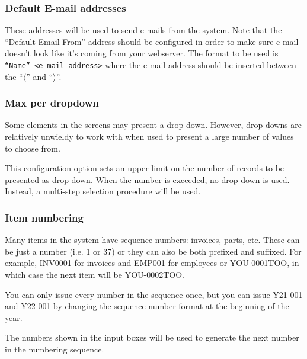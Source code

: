 \subsubsection{Default E-mail addresses}
\label{subsubsec-company-config-defaults-email}

These addresses will be used to send e-mails from the system.
Note that the ``Default Email From'' address should be configured in order to make sure
e-mail doesn't look like it's coming from your webserver. The format to be used is \texttt{``Name'' <e-mail address>} where the e-mail address should be inserted between the
``$\langle$'' and ``$\rangle$''.

\subsubsection{Max per dropdown}
\label{subsubsec-company-config-defaults-max-dropdown}

Some elements in the screens may present a drop down. However, drop downs are
relatively unwieldy to work with when used to present a large number of values
to choose from.

This configuration option sets an upper limit on the number of records to be
presented as drop down.  When the number is exceeded, no drop down is used.  Instead,
a multi-step selection procedure will be used.

\subsubsection{Item numbering}
\label{subsubsec-company-config-defaults-item-numbers}

Many items in the system have sequence numbers: invoices, parts, etc.
These  can be just a number (i.e. 1 or 37) or
they can also be both prefixed and suffixed. For example, INV0001 for invoices and EMP001 for employees or YOU-0001TOO, in which case the next item will be YOU-0002TOO. 

You can only issue every number in the sequence once, but you can issue Y21-001 and Y22-001 by changing the sequence number format at the beginning of the year.

The numbers shown in the input boxes will be used to generate the next number in the
numbering sequence.

